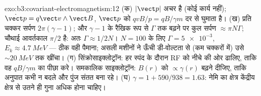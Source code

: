 \begin{solution}{exo:b3:covariant-electromagnetism:12}
(क) $|\vect p|$ अचर है (कोई कार्य नहीं); $\dot{\vect p} = q\vect
v\wedge\vect B$, $\vect p$ को $qvB/p = qB/\gamma m$ दर से घुमाता है। (ख)
प्रति चक्कर सर्पण $2\pi(\gamma - 1)$; और $\gamma - 1$ के रैखिक रूप से
$\Gamma$ तक बढ़ने पर कुल सर्पण $\approx \pi N\Gamma$; चौथाई आवर्तकाल
$\pi/2$ है: अतः $\Gamma \approx 1/2N$। $N = 100$ के लिए $\Gamma =
\num{5e-3}$, $E_k \approx \qty{4.7}{MeV}$ --- ठीक वही पैमाना; असली
मशीनों ने ऊँची डी-वोल्टता से (कम चक्करों में) उसे $\sim\qty{20}{MeV}$
तक खींचा। (ग) सिंक्रोसाइक्लोट्रॉन: हर स्पंद के दौरान RF को नीचे की ओर
ढालिए, ताकि वह $qB/\gamma m$ का पीछा करे। समकालिक साइक्लोट्रॉन:
$B(r)$ को $\propto\gamma(r)$ बढ़ने दीजिए, ताकि अनुपात कभी न बदले और
पुंज संतत बना रहे। (घ) $\gamma = 1 + 590/938 = 1.63$: नेमि का
क्षेत्र केंद्रीय क्षेत्र से उतने ही गुना अधिक होना चाहिए।
\end{solution}

